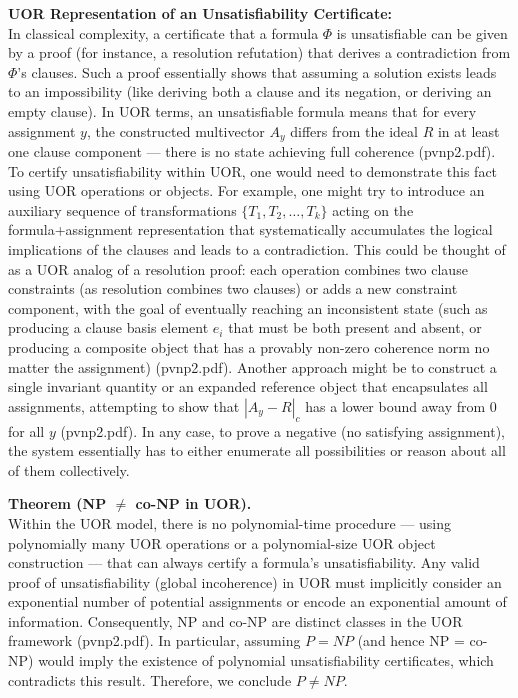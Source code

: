 \documentclass[11pt]{article}
\begin{document}
\textbf{UOR Representation of an Unsatisfiability Certificate:} \\
In classical complexity, a certificate that a formula \(\Phi\) is unsatisfiable can be given by a proof (for instance, a resolution refutation) that derives a contradiction from \(\Phi\)’s clauses. Such a proof essentially shows that assuming a solution exists leads to an impossibility (like deriving both a clause and its negation, or deriving an empty clause). In UOR terms, an unsatisfiable formula means that for every assignment \(y\), the constructed multivector \(A_y\) differs from the ideal \(R\) in at least one clause component --- there is no state achieving full coherence (pvnp2.pdf). To certify unsatisfiability within UOR, one would need to demonstrate this fact using UOR operations or objects. For example, one might try to introduce an auxiliary sequence of transformations \(\{T_1, T_2, \dots, T_k\}\) acting on the formula+assignment representation that systematically accumulates the logical implications of the clauses and leads to a contradiction. This could be thought of as a UOR analog of a resolution proof: each operation combines two clause constraints (as resolution combines two clauses) or adds a new constraint component, with the goal of eventually reaching an inconsistent state (such as producing a clause basis element \(e_i\) that must be both present and absent, or producing a composite object that has a provably non-zero coherence norm no matter the assignment) (pvnp2.pdf). Another approach might be to construct a single invariant quantity or an expanded reference object that encapsulates all assignments, attempting to show that \(|A_y - R|_c\) has a lower bound away from 0 for all \(y\) (pvnp2.pdf). In any case, to prove a negative (no satisfying assignment), the system essentially has to either enumerate all possibilities or reason about all of them collectively.

\bigskip

\textbf{Theorem (NP \(\neq\) co-NP in UOR).} \\
Within the UOR model, there is no polynomial-time procedure --- using polynomially many UOR operations or a polynomial-size UOR object construction --- that can always certify a formula’s unsatisfiability. Any valid proof of unsatisfiability (global incoherence) in UOR must implicitly consider an exponential number of potential assignments or encode an exponential amount of information. Consequently, NP and co-NP are distinct classes in the UOR framework (pvnp2.pdf). In particular, assuming \(P=NP\) (and hence NP = co-NP) would imply the existence of polynomial unsatisfiability certificates, which contradicts this result. Therefore, we conclude \(P \neq NP\).
\end{document}

